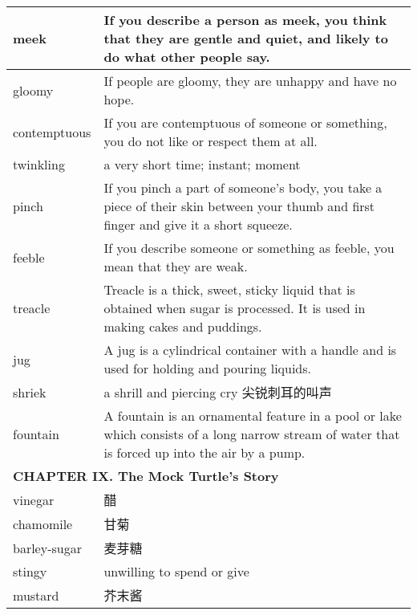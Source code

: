 \documentclass{ctexart}
\begin{document}
\begin{center}
\begin{longtable}{|l|p{7.8cm}|}
\hline
meek
&
If you describe a person as meek, you think that they are gentle and quiet, and likely to do what other people say.
\\

\hline
gloomy
&
If people are gloomy, they are unhappy and have no hope.
\\

\hline
contemptuous
&
If you are contemptuous of someone or something, you do not like or respect them at all.
\\

\hline
twinkling
&
a very short time; instant; moment
\\

\hline
pinch
&
If you pinch a part of someone's body, you take a piece of their skin between your thumb and first finger and give it a short squeeze.
\\

\hline
feeble
&
If you describe someone or something as feeble, you mean that they are weak.
\\

\hline
treacle
&
Treacle is a thick, sweet, sticky liquid that is obtained when sugar is processed. It is used in making cakes and puddings.
\\

\hline
jug
&
A jug is a cylindrical container with a handle and is used for holding and pouring liquids.
\\

\hline
shriek
&
a shrill and piercing cry 尖锐刺耳的叫声
\\

\hline
fountain
&
A fountain is an ornamental feature in a pool or lake which consists of a long narrow stream of water that is forced up into the air by a pump.
\\

\hline
\multicolumn{2}{|l|}{\textbf{ CHAPTER IX. The Mock Turtle’s Story}}\\

\hline
vinegar
&
醋
\\

\hline
chamomile
&
甘菊
\\

\hline
barley-sugar
&
麦芽糖
\\

\hline
stingy
&
unwilling to spend or give
\\

\hline
mustard
&
芥末酱
\\


\end{longtable}
\end{center}
\end{document}
